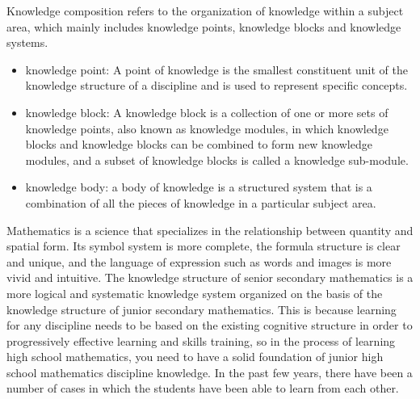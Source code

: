 \documentclass[11pt,en]{elegantpaper}
\begin{document}
Knowledge composition refers to the organization of knowledge within a subject area, which mainly includes knowledge points, knowledge blocks and knowledge systems. 
\begin{itemize}
	\item knowledge point: A point of knowledge is the smallest constituent unit of the knowledge structure of a discipline and is used to represent specific concepts. 
	\item knowledge block: A knowledge block is a collection of one or more sets of knowledge points, also known as knowledge modules, in which knowledge blocks and knowledge blocks can be combined to form new knowledge modules, and a subset of knowledge blocks is called a knowledge sub-module.
	\item knowledge body: a body of knowledge is a structured system that is a combination of all the pieces of knowledge in a particular subject area.
\end{itemize}


Mathematics is a science that specializes in the relationship between quantity and spatial form. Its symbol system is more complete, the formula structure is clear and unique, and the language of expression such as words and images is more vivid and intuitive. The knowledge structure of senior secondary mathematics is a more logical and systematic knowledge system organized on the basis of the knowledge structure of junior secondary mathematics. This is because learning for any discipline needs to be based on the existing cognitive structure in order to progressively effective learning and skills training, so in the process of learning high school mathematics, you need to have a solid foundation of junior high school mathematics discipline knowledge. In the past few years, there have been a number of cases in which the students have been able to learn from each other.
\end{document}

